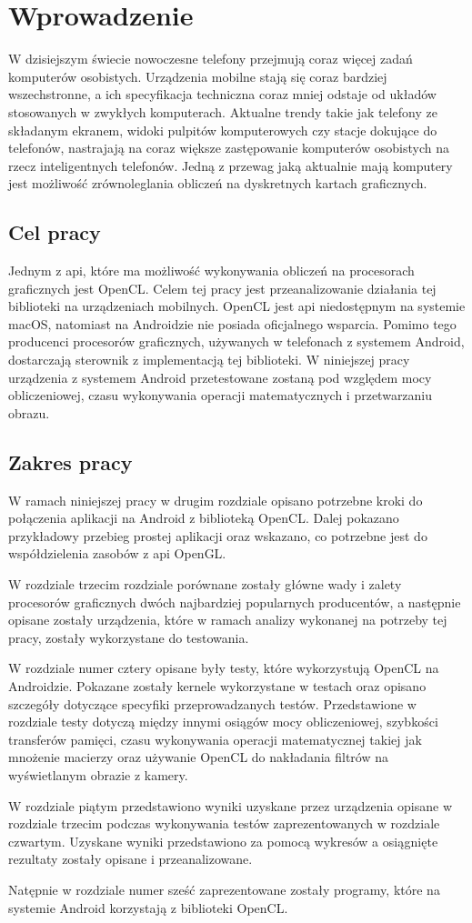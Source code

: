 \section{Wprowadzenie}
W dzisiejszym świecie nowoczesne telefony przejmują coraz więcej zadań komputerów osobistych. Urządzenia mobilne stają się coraz bardziej wszechstronne, a ich specyfikacja techniczna coraz mniej odstaje od układów stosowanych w zwykłych komputerach. Aktualne trendy takie jak telefony ze składanym ekranem, widoki pulpitów komputerowych czy stacje dokujące do telefonów, nastrajają na coraz większe zastępowanie komputerów osobistych na rzecz inteligentnych telefonów. Jedną z przewag jaką aktualnie mają komputery jest możliwość zrównoleglania obliczeń na dyskretnych kartach graficznych. 

\subsection{Cel pracy}
Jednym z api, które ma możliwość wykonywania obliczeń na procesorach graficznych jest OpenCL. Celem tej pracy jest przeanalizowanie działania tej biblioteki na urządzeniach mobilnych. OpenCL jest api niedostępnym na systemie macOS, natomiast na Androidzie nie posiada oficjalnego wsparcia. Pomimo tego producenci procesorów graficznych, używanych w telefonach z systemem Android, dostarczają sterownik z implementacją tej biblioteki. W niniejszej pracy urządzenia z systemem Android przetestowane zostaną pod względem mocy obliczeniowej, czasu wykonywania operacji matematycznych i przetwarzaniu obrazu.

\subsection{Zakres pracy}
W ramach niniejszej pracy w drugim rozdziale opisano potrzebne kroki do połączenia aplikacji na Android z biblioteką OpenCL. Dalej pokazano przykładowy przebieg prostej aplikacji oraz wskazano, co potrzebne jest do współdzielenia zasobów z api OpenGL. 

W rozdziale trzecim rozdziale porównane zostały główne wady i zalety procesorów graficznych dwóch najbardziej popularnych producentów, a następnie opisane zostały urządzenia, które w ramach analizy wykonanej na potrzeby tej pracy, zostały wykorzystane do testowania.

W rozdziale numer cztery opisane były testy, które wykorzystują OpenCL na Androidzie. Pokazane zostały kernele wykorzystane w testach oraz opisano szczegóły dotyczące specyfiki przeprowadzanych testów. Przedstawione w rozdziale testy dotyczą między innymi osiągów mocy obliczeniowej, szybkości transferów pamięci, czasu wykonywania operacji matematycznej takiej jak mnożenie macierzy oraz używanie OpenCL do nakładania filtrów na wyświetlanym obrazie z kamery.

W rozdziale piątym przedstawiono wyniki uzyskane przez urządzenia opisane w rozdziale trzecim podczas wykonywania testów zaprezentowanych w rozdziale czwartym. Uzyskane wyniki przedstawiono za pomocą wykresów a osiągnięte rezultaty zostały opisane i przeanalizowane.

Natępnie w rozdziale numer sześć zaprezentowane zostały programy, które na systemie Android korzystają z biblioteki OpenCL.
